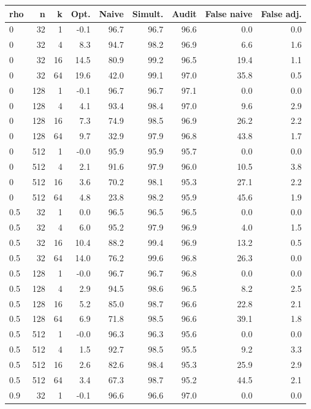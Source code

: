 \begin{tabular}{lrrrrrrrr}
\toprule
rho & n & k & Opt. & Naive & Simult. & Audit & False naive & False adj. \\
\midrule
0 & 32 & 1 & -0.1 & 96.7 & 96.7 & 96.6 & 0.0 & 0.0 \\
0 & 32 & 4 & 8.3 & 94.7 & 98.2 & 96.9 & 6.6 & 1.6 \\
0 & 32 & 16 & 14.5 & 80.9 & 99.2 & 96.5 & 19.4 & 1.1 \\
0 & 32 & 64 & 19.6 & 42.0 & 99.1 & 97.0 & 35.8 & 0.5 \\
0 & 128 & 1 & -0.1 & 96.7 & 96.7 & 97.1 & 0.0 & 0.0 \\
0 & 128 & 4 & 4.1 & 93.4 & 98.4 & 97.0 & 9.6 & 2.9 \\
0 & 128 & 16 & 7.3 & 74.9 & 98.5 & 96.9 & 26.2 & 2.2 \\
0 & 128 & 64 & 9.7 & 32.9 & 97.9 & 96.8 & 43.8 & 1.7 \\
0 & 512 & 1 & -0.0 & 95.9 & 95.9 & 95.7 & 0.0 & 0.0 \\
0 & 512 & 4 & 2.1 & 91.6 & 97.9 & 96.0 & 10.5 & 3.8 \\
0 & 512 & 16 & 3.6 & 70.2 & 98.1 & 95.3 & 27.1 & 2.2 \\
0 & 512 & 64 & 4.8 & 23.8 & 98.2 & 95.9 & 45.6 & 1.9 \\
0.5 & 32 & 1 & 0.0 & 96.5 & 96.5 & 96.5 & 0.0 & 0.0 \\
0.5 & 32 & 4 & 6.0 & 95.2 & 97.9 & 96.9 & 4.0 & 1.5 \\
0.5 & 32 & 16 & 10.4 & 88.2 & 99.4 & 96.9 & 13.2 & 0.5 \\
0.5 & 32 & 64 & 14.0 & 76.2 & 99.6 & 96.8 & 26.3 & 0.0 \\
0.5 & 128 & 1 & -0.0 & 96.7 & 96.7 & 96.8 & 0.0 & 0.0 \\
0.5 & 128 & 4 & 2.9 & 94.5 & 98.6 & 96.5 & 8.2 & 2.5 \\
0.5 & 128 & 16 & 5.2 & 85.0 & 98.7 & 96.6 & 22.8 & 2.1 \\
0.5 & 128 & 64 & 6.9 & 71.8 & 98.5 & 96.6 & 39.1 & 1.8 \\
0.5 & 512 & 1 & -0.0 & 96.3 & 96.3 & 95.6 & 0.0 & 0.0 \\
0.5 & 512 & 4 & 1.5 & 92.7 & 98.5 & 95.5 & 9.2 & 3.3 \\
0.5 & 512 & 16 & 2.6 & 82.6 & 98.4 & 95.3 & 25.9 & 2.9 \\
0.5 & 512 & 64 & 3.4 & 67.3 & 98.7 & 95.2 & 44.5 & 2.1 \\
0.9 & 32 & 1 & -0.1 & 96.6 & 96.6 & 97.0 & 0.0 & 0.0 \\

\end{tabular}
